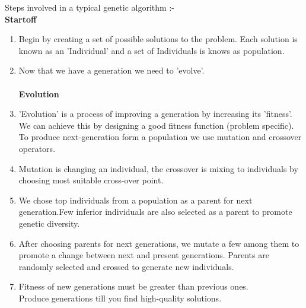 \documentclass[11pt]{article}
\newcommand\tab[1][1cm]{\hspace*{#1}}
\begin{document}
Steps involved in a typical genetic algorithm :-
\\
\linebreak
\tab \textbf{Startoff}
\linebreak
\begin{enumerate}[label = (\roman*)]
\item Begin by creating a set of possible solutions to the problem. Each solution is known as an 'Individual' and a set of Individuals is knows as population.
\item Now that we have a generation we need to 'evolve'.
\\
\\ \textbf{Evolution}
\linebreak
\item 'Evolution' is a process of improving a generation by increasing its 'fitness'. We can achieve this by designing a good fitness function (problem specific). To produce next-generation form a population we use mutation and crossover operators.
\item  Mutation is changing an individual, the crossover is mixing to individuals by choosing most suitable cross-over point.
\item We chose top individuals from a population as a parent for next generation.Few inferior individuals are also selected as a parent to promote genetic diversity.
\item After choosing parents for next generations, we mutate a few among them to promote a change between next and present generations. Parents are randomly selected and crossed to generate new individuals.
\item Fitness of new generations must be greater than previous ones.\\
  \linebreak
  Produce generations till you find high-quality solutions.
\end{enumerate}
\end{document}
